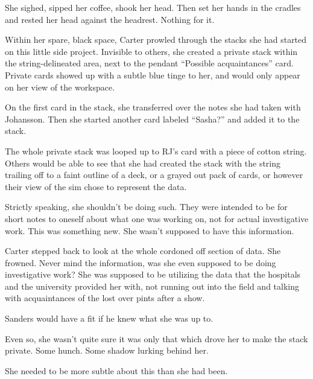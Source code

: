 She sighed, sipped her coffee, shook her head. Then set her hands in the cradles and rested her head against the headrest. Nothing for it.

Within her spare, black space, Carter prowled through the stacks she had started on this little side project. Invisible to others, she created a private stack within the string-delineated area, next to the pendant ``Possible acquaintances'' card. Private cards showed up with a subtle blue tinge to her, and would only appear on her view of the workspace.

On the first card in the stack, she transferred over the notes she had taken with Johansson. Then she started another card labeled ``Sasha?'' and added it to the stack.

The whole private stack was looped up to RJ's card with a piece of cotton string. Others would be able to see that she had created the stack with the string trailing off to a faint outline of a deck, or a grayed out pack of cards, or however their view of the sim chose to represent the data.

Strictly speaking, she shouldn't be doing such. They were intended to be for short notes to oneself about what one was working on, not for actual investigative work. This was something new. She wasn't supposed to have this information.

Carter stepped back to look at the whole cordoned off section of data. She frowned. Never mind the information, was she even supposed to be doing investigative work? She was supposed to be utilizing the data that the hospitals and the university provided her with, not running out into the field and talking with acquaintances of the lost over pints after a show.

Sanders would have a fit if he knew what she was up to.

Even so, she wasn't quite sure it was only that which drove her to make the stack private. Some hunch. Some shadow lurking behind her.

She needed to be more subtle about this than she had been.

